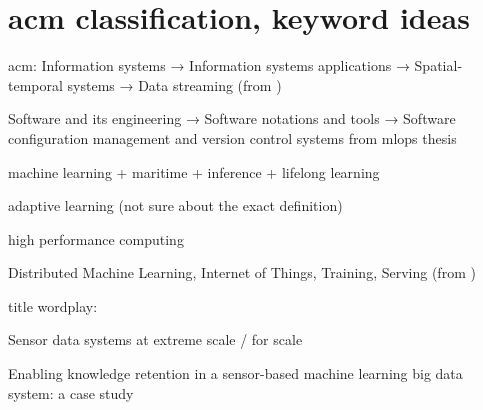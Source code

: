 \section{acm classification,  keyword ideas}

acm:
Information systems → Information systems applications →
Spatial-temporal systems → Data streaming (from \cite{uprctrajectorysystem})

Software and its engineering → Software notations and tools → Software configuration management and version control systems from mlops thesis

machine learning + maritime + inference + lifelong learning

adaptive learning (not sure about the exact definition)

high performance computing

Distributed Machine Learning, Internet of Things, Training, Serving (from \cite{mliot})

title wordplay:

Sensor data systems at extreme scale / for scale

Enabling knowledge retention in a sensor-based machine learning big data system: a case study

